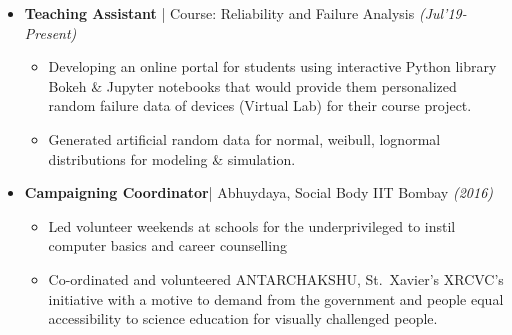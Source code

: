 \documentclass[a4paper, 10pt]{article}
\newcommand{\isep}{-2 pt}
\begin{document}
\begin{itemize}

\itemsep \isep 
\item \textbf{\large Teaching Assistant} | Course: Reliability and Failure Analysis \hfill \emph{(Jul'19-Present)} \\[-0.6cm]
\vspace{-0.12cm}
	\begin{itemize}\itemsep \isep
		\item Developing an online portal for students using interactive Python library Bokeh \& Jupyter notebooks that would provide them personalized random failure data of devices (Virtual Lab) for their course project.
		\item Generated artificial random data for normal, weibull, lognormal distributions for modeling \& simulation. 

\end{itemize}
\vspace{-0.22cm}
 \item \textbf{\large Campaigning Coordinator}| {Abhuydaya, Social Body IIT Bombay} \hfill\emph{(2016)}
 \vspace{-0.3cm}
 
 \begin{itemize}\itemsep \isep
 	\item Led volunteer weekends at schools for the underprivileged to instil computer basics and career counselling
 	\item Co-ordinated and volunteered ANTARCHAKSHU, St.\ Xavier’s XRCVC’s initiative with a motive to demand from the government and people equal accessibility to science education for visually challenged people.
 \end{itemize}
\end{itemize}
\end{document}
